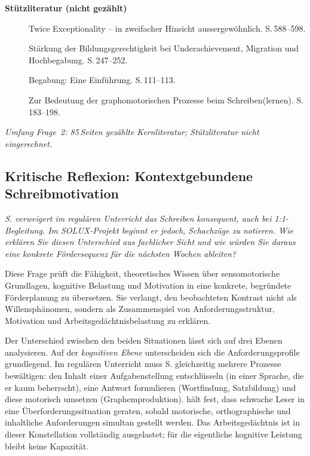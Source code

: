 \documentclass[ngerman, a4paper]{article}
\begin{document}
\textbf{Stützliteratur (nicht gezählt)}

\begin{description}
  \item[\cite{baumschader2021twice}] Twice Exceptionality -- in
        zweifacher Hinsicht aussergewöhnlich. S.\,588--598.

  \item[\cite{warneckehauke2020bildungsgerechtigkeit}] Stärkung der
        Bildungsgerechtigkeit bei Underachievement, Migration und
        Hochbegabung. S.\,247--252.

  \item[\cite{hoyer2013begabung}] Begabung: Eine Einführung.
        S.\,111--113.

  \item[\cite{sturm2016graphomotorik}] Zur Bedeutung der
        graphomotorischen Prozesse beim Schreiben(lernen).
        S.\,183--198.
\end{description}

\textit{Umfang Frage~2: 85\,Seiten gezählte Kernliteratur; Stützliteratur nicht eingerechnet.}




\subsection{Kritische Reflexion: Kontextgebundene Schreibmotivation}


\begin{tcolorbox}[colback=gray!5, colframe=gray!50, title=Weiterführende Diskurslinie]
  \itshape
  S. verweigert im regulären Unterricht das Schreiben konsequent, auch bei
  1:1-Begleitung. Im SOLUX-Projekt beginnt er jedoch, Schachzüge zu notieren.
  Wie erklären Sie diesen Unterschied aus fachlicher Sicht und wie würden Sie
  daraus eine konkrete Fördersequenz für die nächsten Wochen ableiten?
\end{tcolorbox}

Diese Frage prüft die Fähigkeit, theoretisches Wissen über sensomotorische
Grundlagen, kognitive Belastung und Motivation in eine konkrete, begründete
Förderplanung zu übersetzen. Sie verlangt, den beobachteten Kontrast nicht als
Willensphänomen, sondern als Zusammenspiel von Anforderungsstruktur, Motivation
und Arbeitsgedächtnisbelastung zu erklären.

Der Unterschied zwischen den beiden Situationen lässt sich auf drei Ebenen
analysieren. Auf der \textit{kognitiven Ebene} unterscheiden sich die
Anforderungsprofile grundlegend. Im regulären Unterricht muss S. gleichzeitig
mehrere Prozesse bewältigen: den Inhalt einer Aufgabenstellung entschlüsseln
(in einer Sprache, die er kaum beherrscht), eine Antwort formulieren
(Wortfindung, Satzbildung) und diese motorisch umsetzen (Graphemproduktion).
\textcite[S.\,62]{gold2018lesenkannmanlernen} hält fest, dass schwache Leser in
eine Überforderungssituation geraten, sobald motorische, orthographische und
inhaltliche Anforderungen simultan gestellt werden. Das Arbeitsgedächtnis ist
in dieser Konstellation vollständig ausgelastet; für die eigentliche kognitive
Leistung bleibt keine Kapazität.
\end{document}
